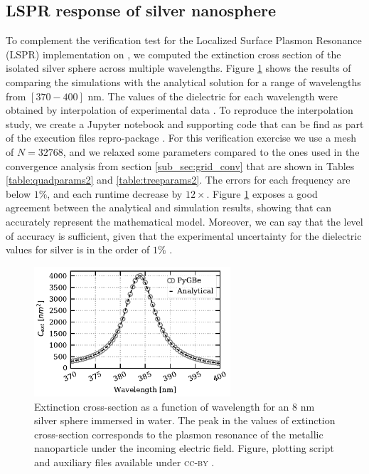 \subsection{LSPR response of silver nanosphere}\label{sub_sec:lspr_silver_np}

To complement the verification test for the Localized Surface Plasmon Resonance (LSPR) implementation
on \pygbe, we computed the extinction cross section of the isolated silver sphere across multiple 
wavelengths. Figure \ref{fig:verif_sph} shows the results of comparing the simulations with the
analytical solution for a range of wavelengths from $[370-400]$ nm. The values of the dielectric 
for each wavelength were obtained by interpolation of experimental data 
\cite{HaleQuerry1972, JohnsonChristy1972}. To reproduce the interpolation study, we create
a Jupyter notebook and supporting code that can be find as part of the execution files
repro-package \cite{ClementiETal2018b}.
For this verification exercise we use a mesh of $N=32768$, and we relaxed some parameters 
compared to the ones used in the convergence analysis from section \ref{sub_sec:grid_conv} 
that are shown in Tables \ref{table:quadparams2} and \ref{table:treeparams2}. The errors for each 
frequency are below $1\%$, and each runtime decrease by $12\times$.
Figure \ref{fig:verif_sph} exposes a good agreement between the analytical and simulation results, 
showing that \pygbe can accurately represent the mathematical model. Moreover, we can say that 
the level of accuracy is sufficient, given that the experimental uncertainty for the dielectric 
values for silver is in the order of $1\%$ \cite{JohnsonChristy1972}. 

\begin{figure}%
    \centering
    \includegraphics[width=0.65\textwidth]{silver_NP_verification.pdf} 
    \caption{Extinction cross-section as a function of wavelength for an $8$ nm
             silver sphere immersed in water. The peak in the values of 
             extinction cross-section corresponds to the plasmon resonance of the metallic 
             nanoparticle under the incoming electric field. Figure, plotting script and 
             auxiliary files available under \textsc{cc-by} \cite{ClementiETal2018d}.}
    \label{fig:verif_sph}
 \end{figure}

